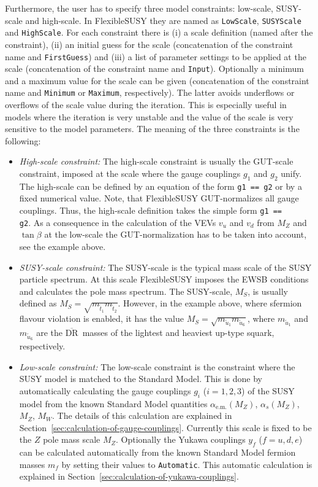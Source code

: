 \documentclass[final,3p,11pt,pdflatex]{elsarticle}
\makeatletter
\newcommand{\fs}{FlexibleSUSY\@\xspace}
\newcommand{\code}[1]{\lstinline|#1|}  %
\newcommand{\textoverline}[1]{$\overline{\mbox{#1}}$}
\newcommand{\DRbar}{\textoverline{DR}\xspace}
\newcommand{\secref}[1]{Section~\ref{#1}}
\makeatother
\begin{document}
Furthermore, the user has to specify three model constraints:
low-scale, SUSY-scale and high-scale.  In \fs they are named as
\code{LowScale}, \code{SUSYScale} and \code{HighScale}.  For each
constraint there is (i) a scale definition (named after the
constraint), (ii) an initial guess for the scale (concatenation of the
constraint name and \code{FirstGuess}) and (iii) a list of parameter
settings to be applied at the scale (concatenation of the constraint
name and \code{Input}).  Optionally a minimum and a maximum value for
the scale can be given (concatenation of the constraint name and
\code{Minimum} or \code{Maximum}, respectively).  The latter avoids
underflows or overflows of the scale value during the iteration.  This
is especially useful in models where the iteration is very unstable
and the value of the scale is very sensitive to the model parameters.
The meaning of the three constraints is the following:
%
\begin{itemize}
\item \emph{High-scale constraint:} The high-scale constraint is
  usually the GUT-scale constraint, imposed at the scale where the
  gauge couplings $g_1$ and $g_2$ unify.  The high-scale can be
  defined by an equation of the form \code{g1 == g2} or by a fixed
  numerical value.  Note, that \fs GUT-normalizes all gauge couplings.
  Thus, the high-scale definition takes the simple form \code{g1 ==
    g2}.  As a consequence in the calculation of the VEVs $v_u$ and
  $v_d$ from $M_Z$ and $\tan\beta$ at the low-scale the
  GUT-normalization has to be taken into account, see the example
  above.
%
\item \emph{SUSY-scale constraint:} The SUSY-scale is the typical mass
  scale of the SUSY particle spectrum.  At this scale \fs imposes the
  EWSB conditions and calculates the pole mass spectrum.  The
  SUSY-scale, $M_S$, is usually defined as $M_S =
  \sqrt{m_{\tilde{t}_1}m_{\tilde{t}_2}}$.  However, in the example
  above, where sfermion flavour violation is enabled, it has the value
  $M_S = \sqrt{m_{\tilde{u}_1}m_{\tilde{u}_6}}$, where
  $m_{\tilde{u}_1}$ and $m_{\tilde{u}_6}$ are the \DRbar\ masses of
  the lightest and heaviest up-type squark, respectively.
%
\item \emph{Low-scale constraint:} The low-scale constraint is the
  constraint where the SUSY model is matched to the Standard Model.
  This is done by automatically calculating the gauge couplings $g_i$
  ($i=1,2,3$) of the SUSY model from the known Standard Model
  quantities $\alpha_{\text{e.m.}}(M_Z)$, $\alpha_{s}(M_Z)$, $M_Z$,
  $M_W$.  The details of this calculation are explained in
  \secref{sec:calculation-of-gauge-couplings}.  Currently this scale
  is fixed to be the $Z$ pole mass scale $M_Z$.  Optionally the Yukawa
  couplings $y_f$ ($f=u,d,e$) can be calculated automatically from the
  known Standard Model fermion masses $m_f$ by setting their values to
  \code{Automatic}.  This automatic calculation is explained in
  \secref{sec:calculation-of-yukawa-couplings}.
\end{itemize}
\end{document}
